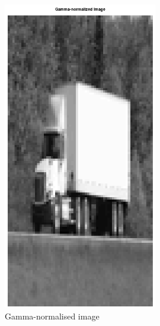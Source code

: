 \documentclass[a4paper]{article}
\begin{document}
\noindent
\begin{minipage}{0.49\textwidth}
\begin{figure}[H]
    \centering
    \includegraphics[width=0.6\textwidth]{./images/3_gamma-normalised.png}
    \caption{Gamma-normalised image}
\end{figure}
\end{minipage}
\hfill
\end{document}
